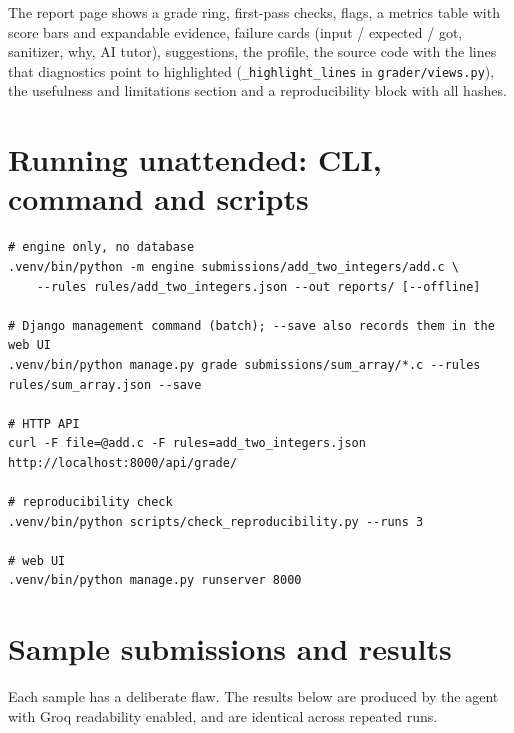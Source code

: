 \documentclass[11pt,a4paper]{article}
\newcommand{\file}[1]{\nolinkurl{#1}}
\newcommand{\fn}[1]{\nolinkurl{#1}}
\begin{document}
The report page shows a grade ring, first-pass checks, flags, a metrics table with score bars and expandable
evidence, failure cards (input / expected / got, sanitizer, why, AI tutor), suggestions, the profile,
the source code with the lines that diagnostics point to highlighted (\fn{_highlight_lines} in
\file{grader/views.py}), the usefulness and limitations section and a reproducibility block with all hashes.

\section{Running unattended: CLI, command and scripts}
\begin{lstlisting}
# engine only, no database
.venv/bin/python -m engine submissions/add_two_integers/add.c \
    --rules rules/add_two_integers.json --out reports/ [--offline]

# Django management command (batch); --save also records them in the web UI
.venv/bin/python manage.py grade submissions/sum_array/*.c --rules rules/sum_array.json --save

# HTTP API
curl -F file=@add.c -F rules=add_two_integers.json http://localhost:8000/api/grade/

# reproducibility check
.venv/bin/python scripts/check_reproducibility.py --runs 3

# web UI
.venv/bin/python manage.py runserver 8000
\end{lstlisting}

\section{Sample submissions and results}
Each sample has a deliberate flaw. The results below are produced by the agent with Groq readability enabled,
and are identical across repeated runs.
\end{document}
